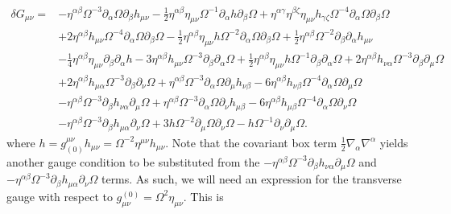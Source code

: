 \documentclass[10pt,letterpaper]{article}
\begin{document}
\begin{align}
\delta G_{\mu\nu}={}&- \eta^{\alpha \beta} \Omega^{-3} \partial_{\alpha}\Omega \partial_{\beta}h_{\mu \nu}
 -  \tfrac{1}{2} \eta^{\alpha \beta} \eta_{\mu \nu} \Omega^{-1} \partial_{\alpha}h \partial_{\beta}\Omega
 + \eta^{\alpha \gamma} \eta^{\beta \zeta} \eta_{\mu \nu} h_{\gamma \zeta} \Omega^{-4} \partial_{\alpha}\Omega \partial_{\beta}\Omega\nonumber\\
& + 2 \eta^{\alpha \beta} h_{\mu \nu} \Omega^{-4} \partial_{\alpha}\Omega \partial_{\beta}\Omega
 -  \tfrac{1}{2} \eta^{\alpha \beta} \eta_{\mu \nu} h \Omega^{-2} \partial_{\alpha}\Omega \partial_{\beta}\Omega
 + \tfrac{1}{2} \eta^{\alpha \beta} \Omega^{-2} \partial_{\beta}\partial_{\alpha}h_{\mu \nu}\nonumber\\
& -  \tfrac{1}{4} \eta^{\alpha \beta} \eta_{\mu \nu} \partial_{\beta}\partial_{\alpha}h
 - 3 \eta^{\alpha \beta} h_{\mu \nu} \Omega^{-3} \partial_{\beta}\partial_{\alpha}\Omega
 + \tfrac{1}{2} \eta^{\alpha \beta} \eta_{\mu \nu} h \Omega^{-1} \partial_{\beta}\partial_{\alpha}\Omega
 + 2 \eta^{\alpha \beta} h_{\nu \alpha} \Omega^{-3} \partial_{\beta}\partial_{\mu}\Omega\nonumber\\
& + 2 \eta^{\alpha \beta} h_{\mu \alpha} \Omega^{-3} \partial_{\beta}\partial_{\nu}\Omega
 + \eta^{\alpha \beta} \Omega^{-3} \partial_{\alpha}\Omega \partial_{\mu}h_{\nu \beta}
 - 6 \eta^{\alpha \beta} h_{\nu \beta} \Omega^{-4} \partial_{\alpha}\Omega \partial_{\mu}\Omega\nonumber\\
& -  \eta^{\alpha \beta} \Omega^{-3} \partial_{\beta}h_{\nu \alpha} \partial_{\mu}\Omega
 + \eta^{\alpha \beta} \Omega^{-3} \partial_{\alpha}\Omega \partial_{\nu}h_{\mu \beta}
 - 6 \eta^{\alpha \beta} h_{\mu \beta} \Omega^{-4} \partial_{\alpha}\Omega \partial_{\nu}\Omega\nonumber\\
& -  \eta^{\alpha \beta} \Omega^{-3} \partial_{\beta}h_{\mu \alpha} \partial_{\nu}\Omega
 + 3 h \Omega^{-2} \partial_{\mu}\Omega \partial_{\nu}\Omega
 -  h \Omega^{-1} \partial_{\nu}\partial_{\mu}\Omega.
\end{align}
where $h = g^{\mu\nu}_{(0)}h_{\mu\nu} = \Omega^{-2}\eta^{\mu\nu}h_{\mu\nu}$. Note that the covariant box term $\tfrac12 \nabla_\alpha\nabla^\alpha$ yields another gauge condition to be substituted from the $ -  \eta^{\alpha \beta} \Omega^{-3} \partial_{\beta}h_{\nu \alpha} \partial_{\mu}\Omega$ and $ -  \eta^{\alpha \beta} \Omega^{-3} \partial_{\beta}h_{\mu \alpha} \partial_{\nu}\Omega$ terms. As such, we will need an expression for the transverse gauge with respect to $g_{\mu\nu}^{(0)}=\Omega^2\eta_{\mu\nu}$. This is
\end{document}
